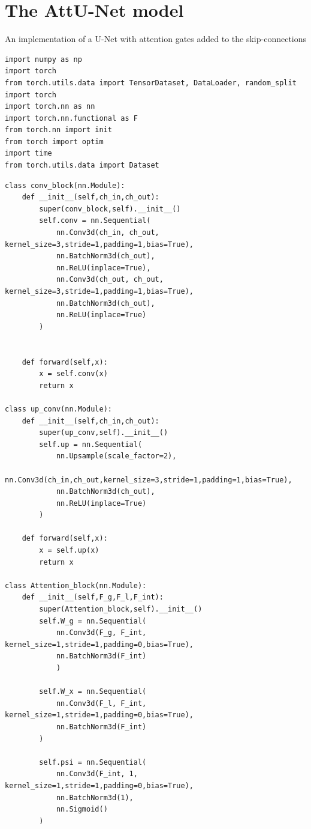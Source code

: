 \section{The AttU-Net model}

An implementation of a U-Net with attention gates added to the skip-connections

\begin{verbatim}
import numpy as np
import torch
from torch.utils.data import TensorDataset, DataLoader, random_split
import torch
import torch.nn as nn
import torch.nn.functional as F
from torch.nn import init
from torch import optim
import time
from torch.utils.data import Dataset
\end{verbatim}

\begin{verbatim}
class conv_block(nn.Module):
    def __init__(self,ch_in,ch_out):
        super(conv_block,self).__init__()
        self.conv = nn.Sequential(
            nn.Conv3d(ch_in, ch_out, kernel_size=3,stride=1,padding=1,bias=True),
            nn.BatchNorm3d(ch_out),
            nn.ReLU(inplace=True),
            nn.Conv3d(ch_out, ch_out, kernel_size=3,stride=1,padding=1,bias=True),
            nn.BatchNorm3d(ch_out),
            nn.ReLU(inplace=True)
        )


    def forward(self,x):
        x = self.conv(x)
        return x

class up_conv(nn.Module):
    def __init__(self,ch_in,ch_out):
        super(up_conv,self).__init__()
        self.up = nn.Sequential(
            nn.Upsample(scale_factor=2),
            nn.Conv3d(ch_in,ch_out,kernel_size=3,stride=1,padding=1,bias=True),
		    nn.BatchNorm3d(ch_out),
			nn.ReLU(inplace=True)
        )

    def forward(self,x):
        x = self.up(x)
        return x

class Attention_block(nn.Module):
    def __init__(self,F_g,F_l,F_int):
        super(Attention_block,self).__init__()
        self.W_g = nn.Sequential(
            nn.Conv3d(F_g, F_int, kernel_size=1,stride=1,padding=0,bias=True),
            nn.BatchNorm3d(F_int)
            )
        
        self.W_x = nn.Sequential(
            nn.Conv3d(F_l, F_int, kernel_size=1,stride=1,padding=0,bias=True),
            nn.BatchNorm3d(F_int)
        )

        self.psi = nn.Sequential(
            nn.Conv3d(F_int, 1, kernel_size=1,stride=1,padding=0,bias=True),
            nn.BatchNorm3d(1),
            nn.Sigmoid()
        )
        

\end{verbatim}
